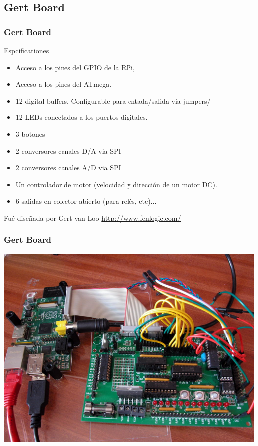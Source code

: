 \documentclass[10pt,colorlinks]{beamer}
\begin{document}
\subsection{Gert Board}
\begin{frame}[fragile]\frametitle{Gert Board}
\begin{block}{Espcificationes}
\begin{itemize}
    \item Acceso a los pines del GPIO de la RPi, 
    \item Acceso a los pines del ATmega.
    \item 12 digital buffers. Configurable  para entada/salida via jumpers/ 
    \item 12 LEDs conectados a los puertos digitales. 
    \item 3 botones
    \item  2 conversores canales D/A via SPI 
    \item  2 conversores canales A/D via SPI 
    \item Un controlador de motor (velocidad y dirección de un motor DC).
    \item 6 salidas en colector abierto (para relés, etc)... 
\end{itemize}
\end{block}
Fué diseñada por  Gert van Loo \href{http://www.fenlogic.com/}{http://www.fenlogic.com/}
\end{frame}

\begin{frame}[fragile]\frametitle{Gert Board}
\includegraphics[width=\textwidth]{figs/gertboard1}
\end{frame}
\end{document}
